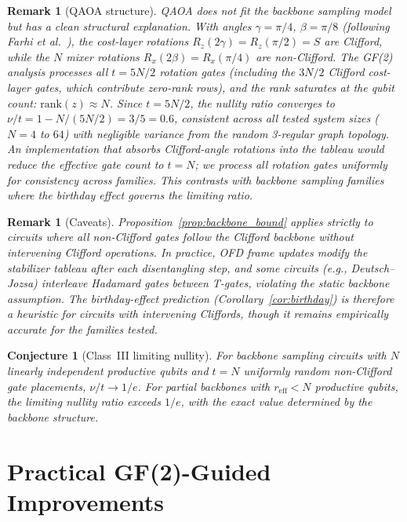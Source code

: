 \documentclass[a4paper,twocolumn,11pt]{quantumarticle}
\newtheorem{conjecture}[theorem]{Conjecture}
\newtheorem{remark}[theorem]{Remark}
\begin{document}
\begin{remark}[QAOA structure]
\label{rem:qaoa}
QAOA does not fit the backbone sampling model but has a clean structural explanation.
With angles $\gamma = \pi/4$, $\beta = \pi/8$ (following Farhi et al.~\cite{farhi2014quantum}), the cost-layer rotations $R_z(2\gamma) = R_z(\pi/2) = S$ are Clifford, while the $N$ mixer rotations $R_x(2\beta) = R_x(\pi/4)$ are non-Clifford.
The GF(2) analysis processes all $t = 5N/2$ rotation gates (including the $3N/2$ Clifford cost-layer gates, which contribute zero-rank rows), and the rank saturates at the qubit count: $\mathrm{rank}(z) \approx N$.
Since $t = 5N/2$, the nullity ratio converges to $\nu/t = 1 - N/(5N/2) = 3/5 = 0.6$, consistent across all tested system sizes ($N = 4$ to $64$) with negligible variance from the random 3-regular graph topology.
An implementation that absorbs Clifford-angle rotations into the tableau would reduce the effective gate count to $t = N$; we process all rotation gates uniformly for consistency across families.
This contrasts with backbone sampling families where the birthday effect governs the limiting ratio.
\end{remark}

\begin{remark}[Caveats]
\label{rem:caveats}
Proposition~\ref{prop:backbone_bound} applies strictly to circuits where all non-Clifford gates follow the Clifford backbone without intervening Clifford operations.
In practice, OFD frame updates modify the stabilizer tableau after each disentangling step, and some circuits (e.g., Deutsch--Jozsa) interleave Hadamard gates between T-gates, violating the static backbone assumption.
The birthday-effect prediction (Corollary~\ref{cor:birthday}) is therefore a heuristic for circuits with intervening Cliffords, though it remains empirically accurate for the families tested.
\end{remark}

\begin{conjecture}[Class~III limiting nullity]
\label{conj:class3}
For backbone sampling circuits with $N$ linearly independent productive qubits and $t = N$ uniformly random non-Clifford gate placements, $\nu/t \to 1/e$.
For partial backbones with $r_{\mathrm{eff}} < N$ productive qubits, the limiting nullity ratio exceeds $1/e$, with the exact value determined by the backbone structure.
\end{conjecture}

\section{Practical GF(2)-Guided Improvements}
\label{sec:practical}
\end{document}
